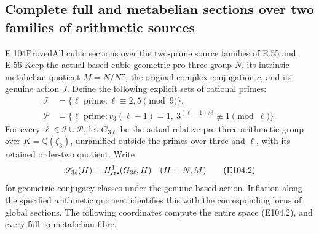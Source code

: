 \subsection{Complete full and metabelian sections over two families of arithmetic sources}

\begin{statement}{E.104}{Proved}{All cubic sections over the two-prime source families of E.55 and E.56}
Keep the actual based cubic geometric pro-three group $N$,
its intrinsic metabelian quotient $M=N/N''$, the original
complex conjugation $c$, and its genuine action $J$.
Define the following explicit sets of rational primes:
\[
 \begin{aligned}
 \mathscr I&=\{\ell\text{ prime}:\ell\equiv2,5\pmod9\},\\
 \mathscr P&=\{\ell\text{ prime}:v_3(\ell-1)=1,
                      \ 3^{(\ell-1)/3}\not\equiv1\pmod\ell\}.
 \end{aligned}
 \tag{E104.1}
\]
For every $\ell\in\mathscr I\cup\mathscr P$, let
$G_{3\ell}$ be the actual relative pro-three arithmetic
group over $K=\mathbb Q(\zeta_3)$, unramified outside
the primes over three and $\ell$, with its retained
order-two quotient. Write
\[
 \mathscr S_{3\ell}(H)=H^1_{\rm cts}(G_{3\ell},H)
       \quad(H=N,M)
 \tag{E104.2}
\]
for geometric-conjugacy classes under the genuine based
action. Inflation along the specified arithmetic quotient
identifies this with the corresponding locus of global
sections. The following coordinates compute the entire
space (E104.2), and every full-to-metabelian fibre.


\end{statement}

